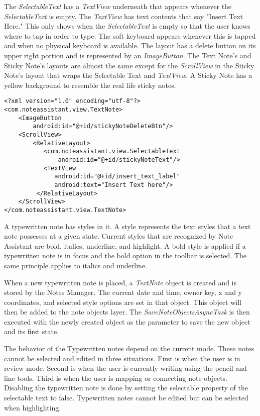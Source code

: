 The \textit{SelectableText} has a \textit{TextView} underneath that appears whenever the \textit{SelectableText} is empty. The \textit{TextView} has text contents that say "Insert Text Here." This only shows when the \textit{SelectableText} is empty so that the user knows where to tap in order to type. The soft keyboard appears whenever this is tapped and when no physical keyboard is available. The layout has a delete button on its upper right portion and is represented by an \textit{ImageButton}. The Text Note's and Sticky Note's layouts are almost the same except for the \textit{ScrollView} in the Sticky Note's layout that wraps the Selectable Text and \textit{TextView}. A Sticky Note has a yellow background to resemble the real life sticky notes.

\begin{lstlisting}[frame=single, label=lst:getcharindexfromtouch, caption=Algorithm for getCharIndexFromTouch]
<?xml version="1.0" encoding="utf-8"?>
<com.noteassistant.view.TextNote>
    <ImageButton
        android:id="@+id/stickyNoteDeleteBtn"/>
    <ScrollView>
        <RelativeLayout>
           <com.noteassistant.view.SelectableText
               android:id="@+id/stickyNoteText"/>
           <TextView
              android:id="@+id/insert_text_label"
              android:text="Insert Text here"/>
         </RelativeLayout>
    </ScrollView>
</com.noteassistant.view.TextNote>
\end{lstlisting}

A typewritten note has styles in it. A style represents the text styles that a text note possesses at a given state. Current styles that are recognized by Note Assistant are bold, italics, underline, and highlight. A bold style is applied if a typewritten note is in focus and the bold option in the toolbar is selected. The same principle applies to italics and underline.  

When a new typewritten note is placed, a \textit{TextNote} object is created and is stored by the Notes Manager. The current date and time, owner key, x and y coordinates, and selected style options are set in that object. This object will then be added to the note objects layer. The \textit{SaveNoteObjectsAsyncTask} is then executed with the newly created object as the parameter to save the new object and its first state.

	The behavior of the Typewritten notes depend on the current mode. These notes cannot be selected and edited in three situations. First is when the user is in review mode. Second is when the user is currently writing using the pencil and line tools. Third is when the user is mapping or connecting note objects. Disabling the typewritten note is done by setting the selectable property of the selectable text to false. Typewritten notes cannot be edited but can be selected when highlighting.

